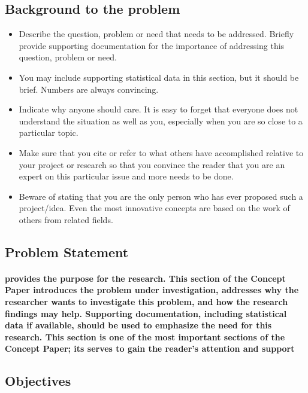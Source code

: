 \documentclass[11pt]{article}
\begin{document}
	 \subsection{\textbf{Background to the problem}}
	  \begin{itemize}
	 	
	 \item Describe the question, problem or need that needs to be addressed. Briefly provide supporting documentation for the importance of addressing this question, problem or need. 
	 \item You may include supporting statistical data in this section, but it should be brief. Numbers are always convincing. \cite{DUMMY:2}
	 \item Indicate why anyone should care. It is easy to forget that everyone does not understand the situation as well as you, especially when you are so close to a particular topic.
	 \item Make sure that you cite or refer to what others have accomplished relative to your project or research so that you convince the reader that you are an expert on this particular issue and more needs to be done. 
	\item Beware of stating that you are the only person who has ever proposed such a project/idea. Even the most innovative concepts are based on the work of others from related fields.
	 	
	 \end{itemize} 
	 
	 \subsection{\textbf{Problem Statement}}
	 
	 \paragraph{\textmd{provides the purpose for the research.  This section of the Concept Paper introduces the problem under investigation, addresses why the researcher wants to investigate this problem, and how the research findings may help.  Supporting documentation, including statistical data if available, should be used to emphasize the need for this research.  This section is one of the most important sections of the Concept Paper; its serves to gain the reader’s attention and support}}
	 
	 \subsection{\textbf{Objectives}}
	 
\end{document}
